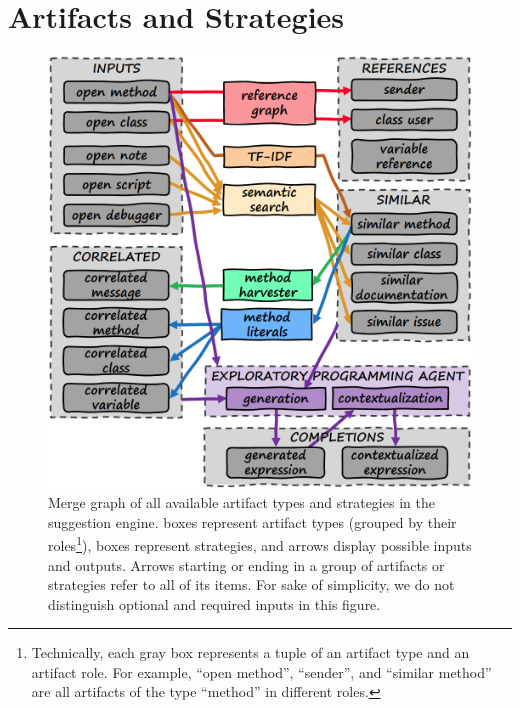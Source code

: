 
\section{Artifacts and Strategies}
\label{sec:suggestions/overview}

\begin{figure}
	\begin{minipage}{\textwidth}
		\centering
		\includegraphics[height=17\baselineskip]{01_overview/graph.png}
		\caption[Merge graph of all available artifact types and strategies in the suggestion engine.]{
			Merge graph of all available artifact types and strategies in the suggestion engine.
			\bold{\textcolor{gray}{Gray}} boxes represent artifact types (grouped by their roles\footnote{%
				Technically, each gray box represents a tuple of an artifact type and an artifact role.
				For example, ``open method'', ``sender'', and ``similar method'' are all artifacts of the type ``method'' in different roles.
			}),  boxes represent strategies, and arrows display possible inputs and outputs.
			Arrows starting or ending in a group of artifacts or strategies refer to all of its items.
			For sake of simplicity, we do not distinguish optional and required inputs in this figure.
		}
		\label{fig:suggestions/overview/graph}
	\end{minipage}
\end{figure}

